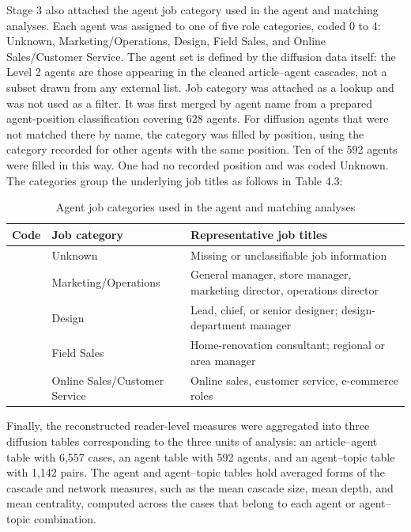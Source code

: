 Stage 3 also attached the agent job category used in the agent and matching analyses. Each agent was assigned to one of five role categories, coded 0 to 4: Unknown, Marketing/Operations, Design, Field Sales, and Online Sales/Customer Service. The agent set is defined by the diffusion data itself: the Level 2 agents are those appearing in the cleaned article–agent cascades, not a subset drawn from any external list. Job category was attached as a lookup and was not used as a filter. It was first merged by agent name from a prepared agent-position classification covering 628 agents. For diffusion agents that were not matched there by name, the category was filled by position, using the category recorded for other agents with the same position. Ten of the 592 agents were filled in this way. One had no recorded position and was coded Unknown. The categories group the underlying job titles as follows in Table 4.3:

\begin{table}[H]
\centering
\small
\caption{Agent job categories used in the agent and matching analyses}
\label{tab:4-3}
\renewcommand{\arraystretch}{1.15}
\begin{tabularx}{\textwidth}{>{\raggedright\arraybackslash}p{}>{\raggedright\arraybackslash}p{}>{\raggedright\arraybackslash}X}
\toprule
\textbf{Code} & \textbf{Job category} & \textbf{Representative job titles} \\
\midrule
0 & Unknown & Missing or unclassifiable job information \\
1 & Marketing/Operations & General manager, store manager, marketing director, operations director \\
2 & Design & Lead, chief, or senior designer; design-department manager \\
3 & Field Sales & Home-renovation consultant; regional or area manager \\
4 & Online Sales/Customer Service & Online sales, customer service, e-commerce roles \\
\bottomrule
\end{tabularx}
\end{table}

Finally, the reconstructed reader-level measures were aggregated into three diffusion tables corresponding to the three units of analysis: an article–agent table with 6,557 cases, an agent table with 592 agents, and an agent–topic table with 1,142 pairs. The agent and agent–topic tables hold averaged forms of the cascade and network measures, such as the mean cascade size, mean depth, and mean centrality, computed across the cases that belong to each agent or agent–topic combination.

